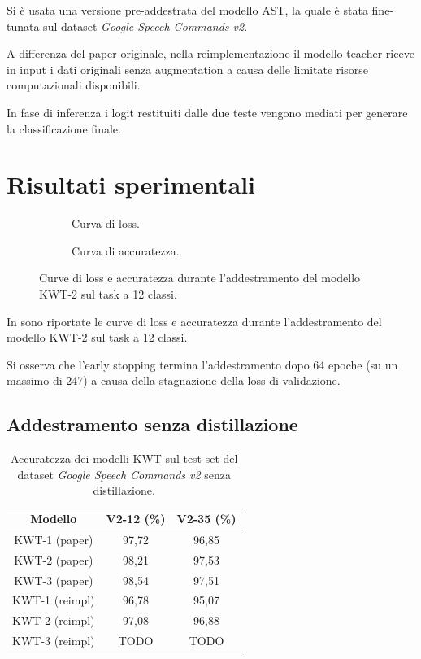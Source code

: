 \documentclass[11pt, a4paper]{article}
\begin{document}
Si è usata una versione pre-addestrata del modello AST, la quale è stata fine-tunata sul dataset \textit{Google Speech Commands v2}.

A differenza del paper originale, nella reimplementazione il modello teacher riceve in input i dati originali senza augmentation a causa delle limitate risorse computazionali disponibili.

In fase di inferenza i logit restituiti dalle due teste vengono mediati per generare la classificazione finale.

\section{Risultati sperimentali}

\begin{figure}
  \begin{subfigure}{0.5\textwidth}
    
    \caption{Curva di loss.}
  \end{subfigure}
  \begin{subfigure}{0.5\textwidth}
    
    \caption{Curva di accuratezza.}
  \end{subfigure}
  \caption{Curve di loss e accuratezza durante l'addestramento del modello KWT-2 sul task a 12 classi.}
  \label{fig:kwt_2_12_curve_training}
\end{figure}

In  sono riportate le curve di loss e accuratezza durante l'addestramento del modello KWT-2 sul task a 12 classi.

Si osserva che l'early stopping termina l'addestramento dopo 64 epoche (su un massimo di 247) a causa della stagnazione della loss di validazione.

\subsection{Addestramento senza distillazione}

\begin{table}
  \center
  \begin{tabular}{ccc}
    \toprule
    \textbf{Modello} & \textbf{V2-12 (\%)} & \textbf{V2-35 (\%)} \\
    \midrule
    KWT-1 (paper) & 97,72 & 96,85 \\
    KWT-2 (paper) & 98,21 & 97,53 \\
    KWT-3 (paper) & 98,54 & 97,51 \\
    \midrule
    KWT-1 (reimpl) & 96,78 & 95,07 \\
    KWT-2 (reimpl) & 97,08 & 96,88 \\
    KWT-3 (reimpl) & TODO & TODO \\
    \bottomrule
  \end{tabular}
  \caption{Accuratezza dei modelli KWT sul test set del dataset \textit{Google Speech Commands v2} senza distillazione.}
  \label{tab:kwt_accuratezza_senza_distillazione}
\end{table}
\end{document}
